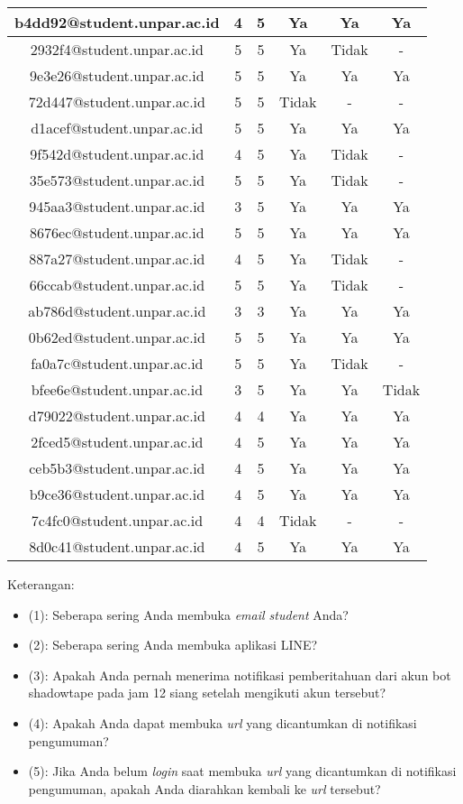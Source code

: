 \begin{longtable}{|c|c|c|c|c|c|}
\hline	b4dd92@student.unpar.ac.id	&	4	&	5	&	Ya	&	Ya	&	Ya	\\
\hline	2932f4@student.unpar.ac.id	&	5	&	5	&	Ya	&	Tidak	&	-	\\
\hline	9e3e26@student.unpar.ac.id	&	5	&	5	&	Ya	&	Ya	&	Ya	\\
\hline	72d447@student.unpar.ac.id	&	5	&	5	&	Tidak	&	-	&	-	\\
\hline	d1acef@student.unpar.ac.id	&	5	&	5	&	Ya	&	Ya	&	Ya	\\
\hline	9f542d@student.unpar.ac.id	&	4	&	5	&	Ya	&	Tidak	&	-	\\
\hline	35e573@student.unpar.ac.id	&	5	&	5	&	Ya	&	Tidak	&	-	\\
\hline	945aa3@student.unpar.ac.id	&	3	&	5	&	Ya	&	Ya	&	Ya	\\
\hline	8676ec@student.unpar.ac.id	&	5	&	5	&	Ya	&	Ya	&	Ya	\\
\hline	887a27@student.unpar.ac.id	&	4	&	5	&	Ya	&	Tidak	&	-	\\
\hline	66ccab@student.unpar.ac.id	&	5	&	5	&	Ya	&	Tidak	&	-	\\
\hline	ab786d@student.unpar.ac.id	&	3	&	3	&	Ya	&	Ya	&	Ya	\\
\hline	0b62ed@student.unpar.ac.id	&	5	&	5	&	Ya	&	Ya	&	Ya	\\
\hline	fa0a7c@student.unpar.ac.id	&	5	&	5	&	Ya	&	Tidak	&	-	\\
\hline	bfee6e@student.unpar.ac.id	&	3	&	5	&	Ya	&	Ya	&	Tidak	\\
\hline	d79022@student.unpar.ac.id	&	4	&	4	&	Ya	&	Ya	&	Ya	\\
\hline	2fced5@student.unpar.ac.id	&	4	&	5	&	Ya	&	Ya	&	Ya	\\
\hline	ceb5b3@student.unpar.ac.id	&	4	&	5	&	Ya	&	Ya	&	Ya	\\
\hline	b9ce36@student.unpar.ac.id	&	4	&	5	&	Ya	&	Ya	&	Ya	\\
\hline	7c4fc0@student.unpar.ac.id	&	4	&	4	&	Tidak	&	-	&	-	\\
\hline	8d0c41@student.unpar.ac.id	&	4	&	5	&	Ya	&	Ya	&	Ya	\\
            \hline
\end{longtable}
Keterangan:
\begin{itemize}
\item (1): Seberapa sering Anda membuka \textit{email student} Anda?
\item (2): Seberapa sering Anda membuka aplikasi LINE?
\item (3): Apakah Anda pernah menerima notifikasi pemberitahuan dari akun bot shadowtape pada jam 12 siang setelah mengikuti akun tersebut?
\item (4): Apakah Anda dapat membuka \textit{url} yang dicantumkan di notifikasi pengumuman?
\item (5): Jika Anda belum \textit{login} saat membuka \textit{url} yang dicantumkan di notifikasi pengumuman, apakah Anda diarahkan kembali ke \textit{url} tersebut?
\end{itemize}

